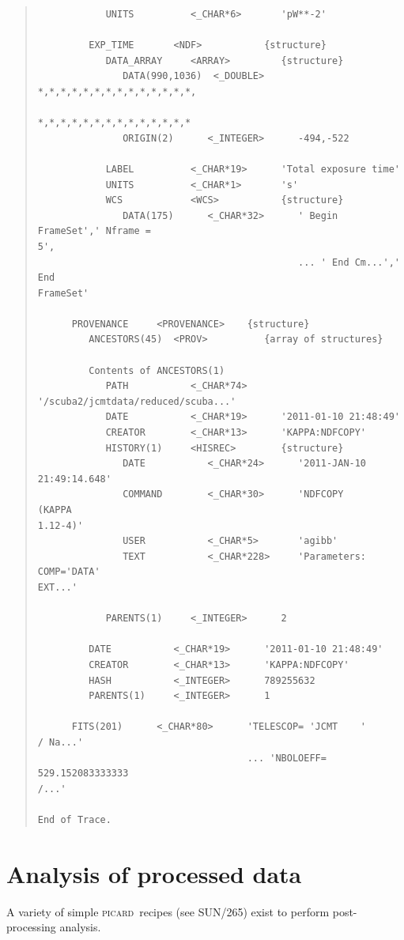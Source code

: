 \documentclass[twoside,11pt]{article}
\newcommand{\xref}[3]{#1}
\newcommand{\xlabel}[1]{}
\renewcommand{\_}{\texttt{\symbol{95}}}
\newenvironment{myquote}{\begin{quote}\begin{small}}{\end{small}\end{quote}}
\newcommand{\picard}{\textsc{picard}}
\newcommand{\picardsun}{\xref{SUN/265}{sun265}{}}
\begin{document}
\begin{myquote}
\begin{verbatim}
            UNITS          <_CHAR*6>       'pW**-2'

         EXP_TIME       <NDF>           {structure}
            DATA_ARRAY     <ARRAY>         {structure}
               DATA(990,1036)  <_DOUBLE>      *,*,*,*,*,*,*,*,*,*,*,*,*,*,
                                              *,*,*,*,*,*,*,*,*,*,*,*,*,*
               ORIGIN(2)      <_INTEGER>      -494,-522

            LABEL          <_CHAR*19>      'Total exposure time'
            UNITS          <_CHAR*1>       's'
            WCS            <WCS>           {structure}
               DATA(175)      <_CHAR*32>      ' Begin FrameSet',' Nframe =
5',
                                              ... ' End Cm...',' End
FrameSet'

      PROVENANCE     <PROVENANCE>    {structure}
         ANCESTORS(45)  <PROV>          {array of structures}

         Contents of ANCESTORS(1)
            PATH           <_CHAR*74>
'/scuba2/jcmtdata/reduced/scuba...'
            DATE           <_CHAR*19>      '2011-01-10 21:48:49'
            CREATOR        <_CHAR*13>      'KAPPA:NDFCOPY'
            HISTORY(1)     <HISREC>        {structure}
               DATE           <_CHAR*24>      '2011-JAN-10 21:49:14.648'
               COMMAND        <_CHAR*30>      'NDFCOPY         (KAPPA
1.12-4)'
               USER           <_CHAR*5>       'agibb'
               TEXT           <_CHAR*228>     'Parameters: COMP='DATA'
EXT...'

            PARENTS(1)     <_INTEGER>      2

         DATE           <_CHAR*19>      '2011-01-10 21:48:49'
         CREATOR        <_CHAR*13>      'KAPPA:NDFCOPY'
         HASH           <_INTEGER>      789255632
         PARENTS(1)     <_INTEGER>      1

      FITS(201)      <_CHAR*80>      'TELESCOP= 'JCMT    '           / Na...'
                                     ... 'NBOLOEFF=     529.152083333333
/...'

End of Trace.
\end{verbatim}
\end{myquote}

\section{\xlabel{picard}Analysis of processed data\label{picard}}

A variety of simple \picard\ recipes (see \picardsun) exist to perform
post-processing analysis.
\end{document}
